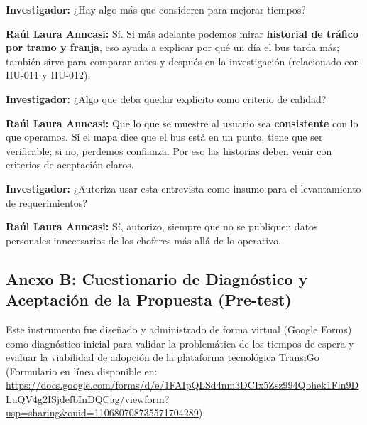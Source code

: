 \vspace{0.35em}
\noindent\textbf{Investigador:} ¿Hay algo más que consideren para mejorar tiempos?

\vspace{0.35em}
\noindent\textbf{Raúl Laura Anncasi:} Sí. Si más adelante podemos mirar \textbf{historial de tráfico por tramo y franja}, eso ayuda a explicar por qué un día el bus tarda más; también sirve para comparar antes y después en la investigación (relacionado con HU-011 y HU-012).

\vspace{0.35em}
\noindent\textbf{Investigador:} ¿Algo que deba quedar explícito como criterio de calidad?

\vspace{0.35em}
\noindent\textbf{Raúl Laura Anncasi:} Que lo que se muestre al usuario sea \textbf{consistente} con lo que operamos. Si el mapa dice que el bus está en un punto, tiene que ser verificable; si no, perdemos confianza. Por eso las historias deben venir con criterios de aceptación claros.

\vspace{0.35em}
\noindent\textbf{Investigador:} ¿Autoriza usar esta entrevista como insumo para el levantamiento de requerimientos?

\vspace{0.35em}
\noindent\textbf{Raúl Laura Anncasi:} Sí, autorizo, siempre que no se publiquen datos personales innecesarios de los choferes más allá de lo operativo.

\subsection*{Anexo B: Cuestionario de Diagnóstico y Aceptación de la Propuesta (Pre-test)}

Este instrumento fue diseñado y administrado de forma virtual (Google Forms) como diagnóstico inicial para validar la problemática de los tiempos de espera y evaluar la viabilidad de adopción de la plataforma tecnológica TransiGo (Formulario en línea disponible en: \url{https://docs.google.com/forms/d/e/1FAIpQLSd4nm3DCIx5Zsz994Qbhek1Fln9DLuQV4g2ISjdefbInDQCag/viewform?usp=sharing&ouid=110680708735571704289}).

